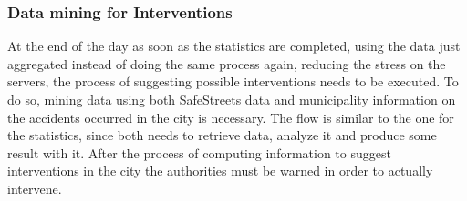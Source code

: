\subsubsection{Data mining for Interventions}
At the end of the day as soon as the statistics are completed, using the data just aggregated instead of doing the same process again, reducing the stress on the servers, the process of suggesting possible interventions needs to be executed. To do so, mining data using both SafeStreets data and municipality information on the accidents occurred in the city is necessary.
The flow is similar to the one for the statistics, since both needs to retrieve data, analyze it and produce some result with it.
After the process of computing information to suggest interventions in the city the authorities must be warned in order to actually intervene.
\\
\\
\\
\\
\\
\clearpage
